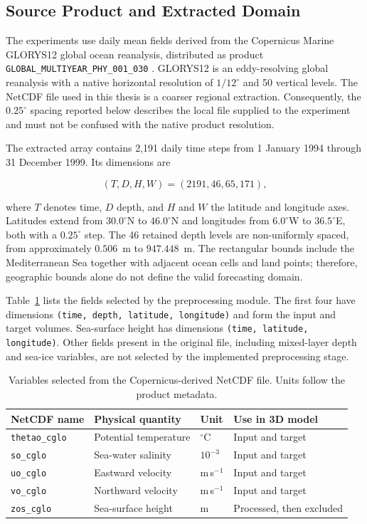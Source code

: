 \subsection{Source Product and Extracted Domain}

The experiments use daily mean fields derived from the Copernicus Marine GLORYS12 global ocean reanalysis, distributed as product \texttt{GLOBAL\_MULTIYEAR\_PHY\_001\_030} \citep{copernicusglorys12,lellouche2021glorys12}. GLORYS12 is an eddy-resolving global reanalysis with a native horizontal resolution of $1/12^{\circ}$ and 50 vertical levels. The NetCDF file used in this thesis is a coarser regional extraction. Consequently, the $0.25^{\circ}$ spacing reported below describes the local file supplied to the experiment and must not be confused with the native product resolution.

The extracted array contains 2,191 daily time steps from 1 January 1994 through 31 December 1999. Its dimensions are

\[
(T,D,H,W)=(2191,46,65,171),
\]

where $T$ denotes time, $D$ depth, and $H$ and $W$ the latitude and longitude axes. Latitudes extend from $30.0^{\circ}$N to $46.0^{\circ}$N and longitudes from $6.0^{\circ}$W to $36.5^{\circ}$E, both with a $0.25^{\circ}$ step. The 46 retained depth levels are non-uniformly spaced, from approximately $0.506$~m to $947.448$~m. The rectangular bounds include the Mediterranean Sea together with adjacent ocean cells and land points; therefore, geographic bounds alone do not define the valid forecasting domain.

Table~\ref{tab:dataset-variables} lists the fields selected by the preprocessing module. The first four have dimensions \texttt{(time, depth, latitude, longitude)} and form the input and target volumes. Sea-surface height has dimensions \texttt{(time, latitude, longitude)}. Other fields present in the original file, including mixed-layer depth and sea-ice variables, are not selected by the implemented preprocessing stage.

\begin{table}[htbp]
\centering
\small
\caption{Variables selected from the Copernicus-derived NetCDF file. Units follow the product metadata.}
\label{tab:dataset-variables}
\begin{tabular}{llll}
\toprule
NetCDF name & Physical quantity & Unit & Use in 3D model \\
\midrule
\texttt{thetao\_cglo} & Potential temperature & $^{\circ}$C & Input and target \\
\texttt{so\_cglo} & Sea-water salinity & $10^{-3}$ & Input and target \\
\texttt{uo\_cglo} & Eastward velocity & m\,s$^{-1}$ & Input and target \\
\texttt{vo\_cglo} & Northward velocity & m\,s$^{-1}$ & Input and target \\
\texttt{zos\_cglo} & Sea-surface height & m & Processed, then excluded \\
\bottomrule
\end{tabular}
\end{table}

